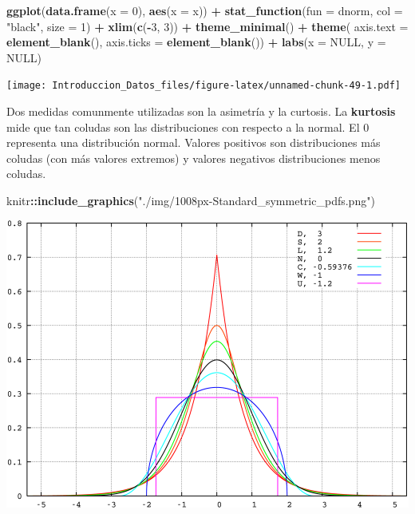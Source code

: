 \documentclass[spanish,]{book}
\newenvironment{Shaded}{\begin{snugshade}}{\end{snugshade}}
\newcommand{\KeywordTok}[1]{\textcolor[rgb]{0.13,0.29,0.53}{\textbf{#1}}}
\newcommand{\DataTypeTok}[1]{\textcolor[rgb]{0.13,0.29,0.53}{#1}}
\newcommand{\DecValTok}[1]{\textcolor[rgb]{0.00,0.00,0.81}{#1}}
\newcommand{\StringTok}[1]{\textcolor[rgb]{0.31,0.60,0.02}{#1}}
\newcommand{\OtherTok}[1]{\textcolor[rgb]{0.56,0.35,0.01}{#1}}
\newcommand{\OperatorTok}[1]{\textcolor[rgb]{0.81,0.36,0.00}{\textbf{#1}}}
\newcommand{\NormalTok}[1]{#1}
\begin{document}
\begin{Shaded}
\begin{Highlighting}[]
\KeywordTok{ggplot}\NormalTok{(}\KeywordTok{data.frame}\NormalTok{(}\DataTypeTok{x =} \DecValTok{0}\NormalTok{), }\KeywordTok{aes}\NormalTok{(}\DataTypeTok{x =}\NormalTok{ x)) }\OperatorTok{+}
\StringTok{    }\KeywordTok{stat_function}\NormalTok{(}\DataTypeTok{fun =}\NormalTok{ dnorm, }\DataTypeTok{col =} \StringTok{"black"}\NormalTok{, }\DataTypeTok{size =} \DecValTok{1}\NormalTok{) }\OperatorTok{+}
\StringTok{    }\KeywordTok{xlim}\NormalTok{(}\KeywordTok{c}\NormalTok{(}\OperatorTok{-}\DecValTok{3}\NormalTok{, }\DecValTok{3}\NormalTok{)) }\OperatorTok{+}
\StringTok{    }\KeywordTok{theme_minimal}\NormalTok{() }\OperatorTok{+}
\StringTok{    }\KeywordTok{theme}\NormalTok{(}
        \DataTypeTok{axis.text =} \KeywordTok{element_blank}\NormalTok{(),}
        \DataTypeTok{axis.ticks =} \KeywordTok{element_blank}\NormalTok{()) }\OperatorTok{+}
\StringTok{    }\KeywordTok{labs}\NormalTok{(}\DataTypeTok{x =} \OtherTok{NULL}\NormalTok{, }\DataTypeTok{y =} \OtherTok{NULL}\NormalTok{)}
\end{Highlighting}
\end{Shaded}

\texttt{[image: Introduccion\_Datos\_files/figure-latex/unnamed-chunk-49-1.pdf]}

Dos medidas comunmente utilizadas son la asimetría y la curtosis. La
\textbf{kurtosis} mide que tan coludas son las distribuciones con
respecto a la normal. El 0 representa una distribución normal. Valores
positivos son distribuciones más coludas (con más valores extremos) y
valores negativos distribuciones menos coludas.

\begin{Shaded}
\begin{Highlighting}[]
\NormalTok{knitr}\OperatorTok{::}\KeywordTok{include_graphics}\NormalTok{(}\StringTok{"./img/1008px-Standard_symmetric_pdfs.png"}\NormalTok{)}
\end{Highlighting}
\end{Shaded}

\begin{center}\includegraphics[width=0.75\linewidth]{./img/1008px-Standard_symmetric_pdfs} \end{center}
\end{document}
